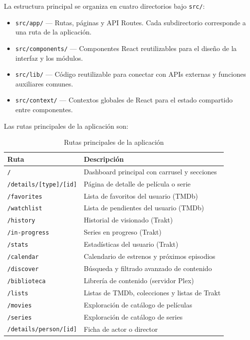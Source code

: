 La estructura principal se organiza en cuatro directorios bajo \texttt{src/}:

\begin{itemize}
\item \texttt{src/app/} --- Rutas, páginas y API Routes. Cada subdirectorio corresponde a una ruta de la aplicación.
\item \texttt{src/components/} --- Componentes React reutilizables para el diseño de la interfaz y los módulos.
\item \texttt{src/lib/} --- Código reutilizable para conectar con APIs externas y funciones auxiliares comunes.
\item \texttt{src/context/} --- Contextos globales de React para el estado compartido entre componentes.
\end{itemize}

Las rutas principales de la aplicación son:

\begin{table}[H]
\begin{center}
\begin{tabular}{| l | l |}
\hline
\textbf{Ruta} & \textbf{Descripción} \\
\hline
\hline
\texttt{/} & Dashboard principal con carrusel y secciones \\
\hline
\texttt{/details/[type]/[id]} & Página de detalle de película o serie \\
\hline
\texttt{/favorites} & Lista de favoritos del usuario (TMDb) \\
\hline
\texttt{/watchlist} & Lista de pendientes del usuario (TMDb) \\
\hline
\texttt{/history} & Historial de visionado (Trakt) \\
\hline
\texttt{/in-progress} & Series en progreso (Trakt) \\
\hline
\texttt{/stats} & Estadísticas del usuario (Trakt) \\
\hline
\texttt{/calendar} & Calendario de estrenos y próximos episodios \\
\hline
\texttt{/discover} & Búsqueda y filtrado avanzado de contenido \\
\hline
\texttt{/biblioteca} & Librería de contenido (servidor Plex) \\
\hline
\texttt{/lists} & Listas de TMDb, colecciones y listas de Trakt \\
\hline
\texttt{/movies} & Exploración de catálogo de películas \\
\hline
\texttt{/series} & Exploración de catálogo de series \\
\hline
\texttt{/details/person/[id]} & Ficha de actor o director \\
\hline
\end{tabular}
\caption{Rutas principales de la aplicación}
\label{tab:rutas}
\end{center}
\end{table}

